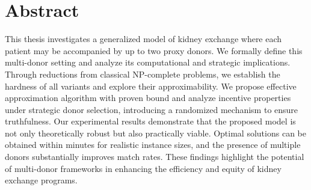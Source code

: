 \begingroup
\let\clearpage\relax
\let\cleardoublepage\relax
\let\cleardoublepage\relax

\chapter*{Abstract}
This thesis investigates a generalized model of kidney exchange where each patient may be accompanied by up to two proxy donors. We formally define this multi-donor setting and analyze its computational and strategic implications. Through reductions from classical NP-complete problems, we establish the hardness of all variants and explore their approximability. We propose effective approximation algorithm with proven bound and analyze incentive properties under strategic donor selection, introducing a randomized mechanism to ensure truthfulness. Our experimental results demonstrate that the proposed model is not only theoretically robust but also practically viable. Optimal solutions can be obtained within minutes for realistic instance sizes, and the presence of multiple donors substantially improves match rates. These findings highlight the potential of multi-donor frameworks in enhancing the efficiency and equity of kidney exchange programs.


\vfill

\endgroup			

\vfill